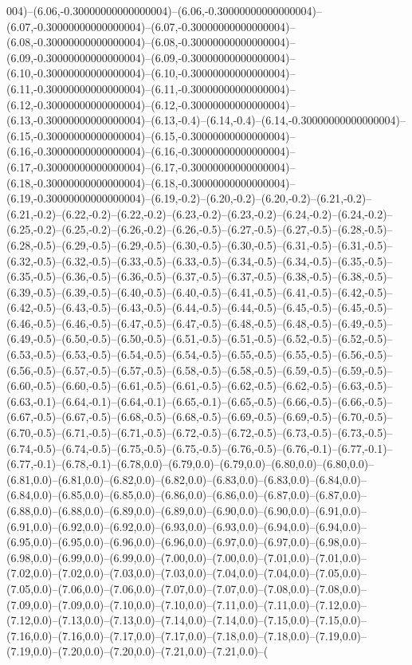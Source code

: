 004)--(6.06,-0.30000000000000004)--(6.06,-0.30000000000000004)--(6.07,-0.30000000000000004)--(6.07,-0.30000000000000004)--(6.08,-0.30000000000000004)--(6.08,-0.30000000000000004)--(6.09,-0.30000000000000004)--(6.09,-0.30000000000000004)--(6.10,-0.30000000000000004)--(6.10,-0.30000000000000004)--(6.11,-0.30000000000000004)--(6.11,-0.30000000000000004)--(6.12,-0.30000000000000004)--(6.12,-0.30000000000000004)--(6.13,-0.30000000000000004)--(6.13,-0.4)--(6.14,-0.4)--(6.14,-0.30000000000000004)--(6.15,-0.30000000000000004)--(6.15,-0.30000000000000004)--(6.16,-0.30000000000000004)--(6.16,-0.30000000000000004)--(6.17,-0.30000000000000004)--(6.17,-0.30000000000000004)--(6.18,-0.30000000000000004)--(6.18,-0.30000000000000004)--(6.19,-0.30000000000000004)--(6.19,-0.2)--(6.20,-0.2)--(6.20,-0.2)--(6.21,-0.2)--(6.21,-0.2)--(6.22,-0.2)--(6.22,-0.2)--(6.23,-0.2)--(6.23,-0.2)--(6.24,-0.2)--(6.24,-0.2)--(6.25,-0.2)--(6.25,-0.2)--(6.26,-0.2)--(6.26,-0.5)--(6.27,-0.5)--(6.27,-0.5)--(6.28,-0.5)--(6.28,-0.5)--(6.29,-0.5)--(6.29,-0.5)--(6.30,-0.5)--(6.30,-0.5)--(6.31,-0.5)--(6.31,-0.5)--(6.32,-0.5)--(6.32,-0.5)--(6.33,-0.5)--(6.33,-0.5)--(6.34,-0.5)--(6.34,-0.5)--(6.35,-0.5)--(6.35,-0.5)--(6.36,-0.5)--(6.36,-0.5)--(6.37,-0.5)--(6.37,-0.5)--(6.38,-0.5)--(6.38,-0.5)--(6.39,-0.5)--(6.39,-0.5)--(6.40,-0.5)--(6.40,-0.5)--(6.41,-0.5)--(6.41,-0.5)--(6.42,-0.5)--(6.42,-0.5)--(6.43,-0.5)--(6.43,-0.5)--(6.44,-0.5)--(6.44,-0.5)--(6.45,-0.5)--(6.45,-0.5)--(6.46,-0.5)--(6.46,-0.5)--(6.47,-0.5)--(6.47,-0.5)--(6.48,-0.5)--(6.48,-0.5)--(6.49,-0.5)--(6.49,-0.5)--(6.50,-0.5)--(6.50,-0.5)--(6.51,-0.5)--(6.51,-0.5)--(6.52,-0.5)--(6.52,-0.5)--(6.53,-0.5)--(6.53,-0.5)--(6.54,-0.5)--(6.54,-0.5)--(6.55,-0.5)--(6.55,-0.5)--(6.56,-0.5)--(6.56,-0.5)--(6.57,-0.5)--(6.57,-0.5)--(6.58,-0.5)--(6.58,-0.5)--(6.59,-0.5)--(6.59,-0.5)--(6.60,-0.5)--(6.60,-0.5)--(6.61,-0.5)--(6.61,-0.5)--(6.62,-0.5)--(6.62,-0.5)--(6.63,-0.5)--(6.63,-0.1)--(6.64,-0.1)--(6.64,-0.1)--(6.65,-0.1)--(6.65,-0.5)--(6.66,-0.5)--(6.66,-0.5)--(6.67,-0.5)--(6.67,-0.5)--(6.68,-0.5)--(6.68,-0.5)--(6.69,-0.5)--(6.69,-0.5)--(6.70,-0.5)--(6.70,-0.5)--(6.71,-0.5)--(6.71,-0.5)--(6.72,-0.5)--(6.72,-0.5)--(6.73,-0.5)--(6.73,-0.5)--(6.74,-0.5)--(6.74,-0.5)--(6.75,-0.5)--(6.75,-0.5)--(6.76,-0.5)--(6.76,-0.1)--(6.77,-0.1)--(6.77,-0.1)--(6.78,-0.1)--(6.78,0.0)--(6.79,0.0)--(6.79,0.0)--(6.80,0.0)--(6.80,0.0)--(6.81,0.0)--(6.81,0.0)--(6.82,0.0)--(6.82,0.0)--(6.83,0.0)--(6.83,0.0)--(6.84,0.0)--(6.84,0.0)--(6.85,0.0)--(6.85,0.0)--(6.86,0.0)--(6.86,0.0)--(6.87,0.0)--(6.87,0.0)--(6.88,0.0)--(6.88,0.0)--(6.89,0.0)--(6.89,0.0)--(6.90,0.0)--(6.90,0.0)--(6.91,0.0)--(6.91,0.0)--(6.92,0.0)--(6.92,0.0)--(6.93,0.0)--(6.93,0.0)--(6.94,0.0)--(6.94,0.0)--(6.95,0.0)--(6.95,0.0)--(6.96,0.0)--(6.96,0.0)--(6.97,0.0)--(6.97,0.0)--(6.98,0.0)--(6.98,0.0)--(6.99,0.0)--(6.99,0.0)--(7.00,0.0)--(7.00,0.0)--(7.01,0.0)--(7.01,0.0)--(7.02,0.0)--(7.02,0.0)--(7.03,0.0)--(7.03,0.0)--(7.04,0.0)--(7.04,0.0)--(7.05,0.0)--(7.05,0.0)--(7.06,0.0)--(7.06,0.0)--(7.07,0.0)--(7.07,0.0)--(7.08,0.0)--(7.08,0.0)--(7.09,0.0)--(7.09,0.0)--(7.10,0.0)--(7.10,0.0)--(7.11,0.0)--(7.11,0.0)--(7.12,0.0)--(7.12,0.0)--(7.13,0.0)--(7.13,0.0)--(7.14,0.0)--(7.14,0.0)--(7.15,0.0)--(7.15,0.0)--(7.16,0.0)--(7.16,0.0)--(7.17,0.0)--(7.17,0.0)--(7.18,0.0)--(7.18,0.0)--(7.19,0.0)--(7.19,0.0)--(7.20,0.0)--(7.20,0.0)--(7.21,0.0)--(7.21,0.0)--(